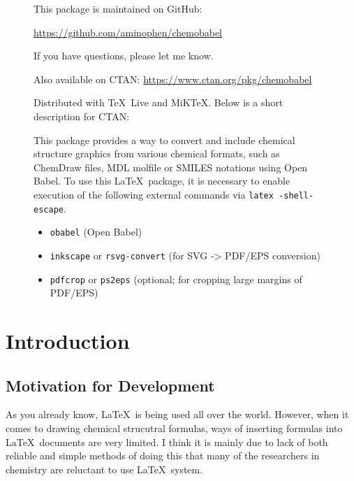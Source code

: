 \documentclass[12pt]{ltjsarticle}
\def\Lcode#1{\texttt{#1}}
\begin{document}
\begin{figure}[ht]
\centering
This package is maintained on GitHub:\par
\url{https://github.com/aminophen/chemobabel}\par
If you have questions, please let me know.
\end{figure}

\begin{figure}[ht]
\centering
Also available on CTAN:
\url{https://www.ctan.org/pkg/chemobabel}\par
Distributed with \TeX\ Live and MiK\TeX.
Below is a short description for CTAN:\par
\begin{screen}
This package provides a way to convert and include
chemical structure graphics from various chemical formats,
such as ChemDraw files, MDL molfile or SMILES notations
using Open Babel.
To use this \LaTeX\ package, it is necessary to enable execution
of the following external commands via \Lcode{latex -shell-escape}.
\begin{itemize}
 \item \Lcode{obabel} (Open Babel)
 \item \Lcode{inkscape} or \Lcode{rsvg-convert}
   (for SVG -> PDF/EPS conversion)
 \item \Lcode{pdfcrop} or \Lcode{ps2eps}
   (optional; for cropping large margins of PDF/EPS)
\end{itemize}
\end{screen}
\end{figure}

\clearpage
\setcounter{tocdepth}{3}
\tableofcontents

\clearpage
{}

\section{Introduction}

\subsection{Motivation for Development}

As you already know, \LaTeX\ is being used all over the world.
However, when it comes to drawing chemical strucutral formulas,
ways of inserting formulas into \LaTeX\ documents are very limited.
I think it is mainly due to lack of both reliable and simple methods
of doing this that many of the researchers in chemistry are reluctant
to use \LaTeX\ system.
\end{document}
